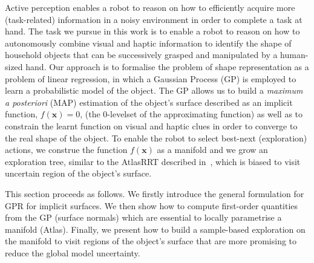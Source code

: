 
Active perception enables a robot to reason on how to efficiently acquire more (task-related) information in a noisy environment in order to complete a task at hand.
The task we pursue in this work is to enable a robot to reason on how to autonomously combine visual and haptic information to identify the shape of household objects that can be successively grasped and manipulated by a human-sized hand. Our approach is to formalise the problem of shape representation as a problem of linear regression, in which a Gaussian Process (GP) is employed to learn a probabilistic model of the object. The GP allows us to build a \emph{maximum a posteriori} (MAP) estimation of the object's surface described as an implicit function, $f(\mathbf{x})=0$, (the 0-levelset of the approximating function) as well as to constrain the learnt function on visual and haptic clues in order to converge to the real shape of the object. To enable the robot to select best-next (exploration) actions, we construe the function $f(\mathbf{x})$ as a manifold and we grow an exploration tree, similar to the AtlasRRT described in~\cite{Jaillet2013Path}, which is biased to visit uncertain region of the object's surface.

This section proceeds as follows. We firstly introduce the general formulation for GPR for implicit surfaces. We then show how to compute first-order quantities from the GP (surface normals) which are essential to locally parametrise a manifold (Atlas). Finally, we present how to build a sample-based exploration on the manifold to visit regions of the object's surface that are more promising to reduce the global model uncertainty.


